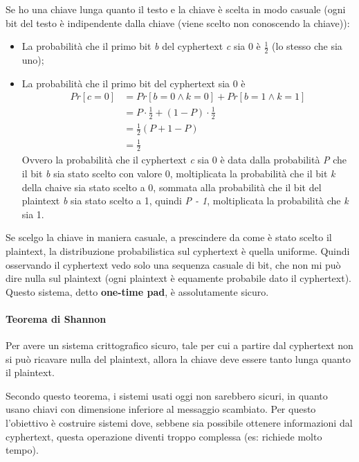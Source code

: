 \noindent Se ho una chiave lunga quanto il testo e la chiave è scelta in modo casuale (ogni bit del testo è indipendente dalla chiave (viene scelto non conoscendo la chiave)):
\begin{itemize}
    \item La probabilità che il primo bit \textit{b} del cyphertext \textit{c} sia 0 è $\frac{1}{2}$ (lo stesso che sia uno);
    \item La probabilità che il primo bit del cyphertext sia 0 è
        \begin{align*}
            Pr[c = 0] &= Pr[b = 0 \land k = 0] + Pr[b = 1 \land k = 1]\\
                    &= P \cdot \frac{1}{2} + (1-P) \cdot \frac{1}{2}\\
                    &= \frac{1}{2} (P+1-P)\\
                    &= \frac{1}{2}
        \end{align*}
    \noindent Ovvero la probabilità che il cyphertext \textit{c} sia 0 è data dalla probabilità \textit{P} che il bit \textit{b} sia stato scelto con valore 0, moltiplicata la probabilità che il bit \textit{k} della chaive sia stato scelto a 0, sommata alla probabilità che il bit del plaintext \textit{b} sia stato scelto a 1, quindi \textit{P - 1}, moltiplicata la probabilità che \textit{k} sia 1.
\end{itemize}

\noindent Se scelgo la chiave in maniera casuale, a prescindere da come è stato scelto il plaintext, la distribuzione probabilistica sul cyphertext è quella uniforme. Quindi osservando il cyphertext vedo solo una sequenza casuale di bit, che non mi può dire nulla sul plaintext (ogni plaintext è equamente probabile dato il cyphertext). Questo sistema, detto \textbf{one-time pad}, è assolutamente sicuro.

\paragraph{Teorema di Shannon} Per avere un sistema crittografico sicuro, tale per cui a partire dal cyphertext non si può ricavare nulla del plaintext, allora la chiave deve essere tanto lunga quanto il plaintext. 

Secondo questo teorema, i sistemi usati oggi non sarebbero sicuri, in quanto usano chiavi con dimensione inferiore al messaggio scambiato. Per questo l'obiettivo è costruire sistemi dove, sebbene sia possibile ottenere informazioni dal cyphertext, questa operazione diventi troppo complessa (es: richiede molto tempo).
	
